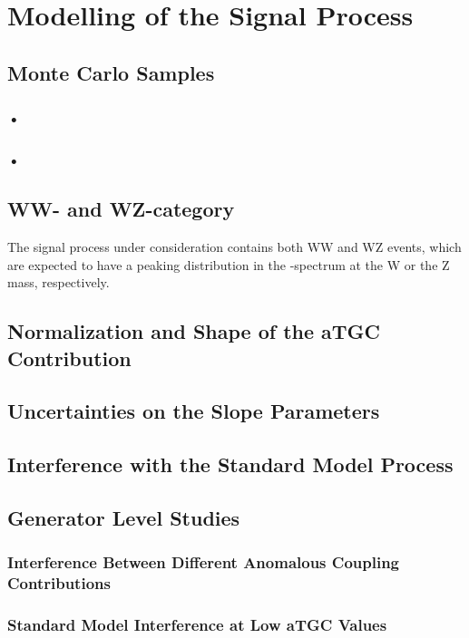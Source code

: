 \chapter{Modelling of the Signal Process}
\label{chap:ModellingoftheSignalProcess}

\section{Monte Carlo Samples}
\subsection{•}
\subsection{•}
\section{WW- and WZ-category}
The signal process under consideration contains both WW and WZ events, which are expected to have a peaking distribution in the \Mpr -spectrum at the W or the Z mass, respectively.
\section{Normalization and Shape of the aTGC Contribution}
\label{sec:NormalizationandShapeoftheaTGCContribution}
\section{Uncertainties on the Slope Parameters}
\section{Interference with the Standard Model Process}
\section{Generator Level Studies}
\subsection{Interference Between Different Anomalous Coupling Contributions}
\subsection{Standard Model Interference at Low aTGC Values}
